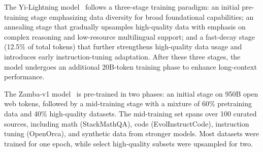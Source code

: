 The Yi-Lightning model~\cite{wake2024yi} follows a three-stage training paradigm: an initial pre-training stage emphasizing data diversity for broad foundational capabilities; an annealing stage that gradually upsamples high-quality data with emphasis on complex reasoning and low-resource multilingual support; and a fast-decay stage (12.5\% of total tokens) that further strengthens high-quality data usage and introduces early instruction-tuning adaptation. After these three stages, the model undergoes an additional 20B-token training phase to enhance long-context performance.

The Zamba-v1 model~\cite{glorioso2024zamba} is pre-trained in two phases: an initial stage on 950B open web tokens, followed by a mid-training stage with a mixture of 60\% pretraining data and 40\% high-quality datasets. The mid-training set spans over 100 curated sources, including math (StackMathQA), code (EvolInstructCode), instruction tuning (OpenOrca), and synthetic data from stronger models. Most datasets were trained for one epoch, while select high-quality subsets were upsampled for two.

